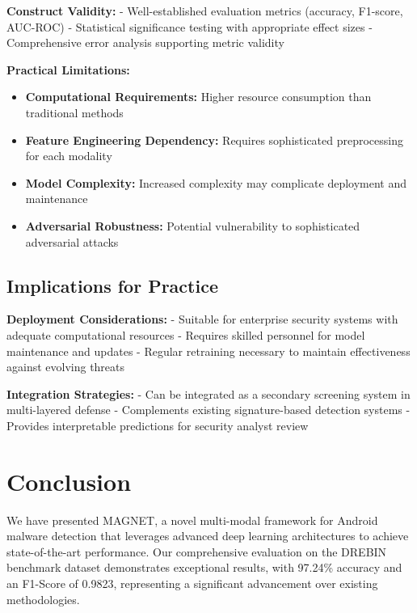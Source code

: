 \documentclass[a4paper,11pt]{article}
\begin{document}
\textbf{Construct Validity:}
- Well-established evaluation metrics (accuracy, F1-score, AUC-ROC)
- Statistical significance testing with appropriate effect sizes
- Comprehensive error analysis supporting metric validity

\textbf{Practical Limitations:}
\begin{itemize}
    \item \textbf{Computational Requirements:} Higher resource consumption than traditional methods
    \item \textbf{Feature Engineering Dependency:} Requires sophisticated preprocessing for each modality
    \item \textbf{Model Complexity:} Increased complexity may complicate deployment and maintenance
    \item \textbf{Adversarial Robustness:} Potential vulnerability to sophisticated adversarial attacks
\end{itemize}

\subsection{Implications for Practice}
\textbf{Deployment Considerations:}
- Suitable for enterprise security systems with adequate computational resources
- Requires skilled personnel for model maintenance and updates
- Regular retraining necessary to maintain effectiveness against evolving threats

\textbf{Integration Strategies:}
- Can be integrated as a secondary screening system in multi-layered defense
- Complements existing signature-based detection systems
- Provides interpretable predictions for security analyst review

\section{Conclusion}
We have presented MAGNET, a novel multi-modal framework for Android malware detection that leverages advanced deep learning architectures to achieve state-of-the-art performance. Our comprehensive evaluation on the DREBIN benchmark dataset demonstrates exceptional results, with 97.24\% accuracy and an F1-Score of 0.9823, representing a significant advancement over existing methodologies.
\end{document}

